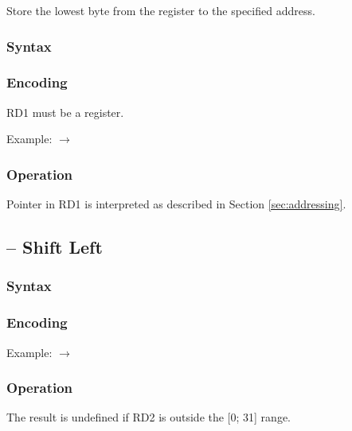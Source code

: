 \documentclass[a4paper,12pt,twoside,extrafontsizes]{memoir}
\begin{document}
{Store the lowest byte from the register to the specified address.

\subsubsection{Syntax}


\subsubsection{Encoding}


RD1 must be a register.

Example:  $\rightarrow$ 

\subsubsection{Operation}


Pointer in RD1 is interpreted as described in Section \ref{sec:addressing}.

\subsection{ -- Shift Left}
\label{subsec:instr:sl}

\subsubsection{Syntax}


\subsubsection{Encoding}


Example:  $\rightarrow$ 

\subsubsection{Operation}


The result is undefined if RD2 is outside the [0; 31] range.

}
\end{document}
